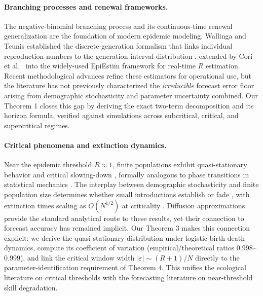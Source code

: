 \documentclass[review]{elsarticle}
\theoremstyle{plain}
\theoremstyle{definition}
\begin{document}
\paragraph{Branching processes and renewal frameworks.}
The negative-binomial branching process \citep{harris1963branching} and its continuous-time renewal generalization \citep{jagers1975branching} are the foundation of modern epidemic modeling. Wallinga and Teunis \citep{wallinga2004different} established the discrete-generation formalism that links individual reproduction numbers to the generation-interval distribution \citep{wallinga2007generation}, extended by Cori et al.~\citep{cori2013framework} into the widely-used EpiEstim framework for real-time $R$ estimation. Recent methodological advances \citep{gostic2020practical, abbott2020epinow2} refine these estimators for operational use, but the literature has not previously characterized the \emph{irreducible} forecast error floor arising from demographic stochasticity and parameter uncertainty combined. Our Theorem 1 closes this gap by deriving the exact two-term decomposition and its horizon formula, verified against simulations across subcritical, critical, and supercritical regimes.

\paragraph{Critical phenomena and extinction dynamics.}
Near the epidemic threshold $R \approx 1$, finite populations exhibit quasi-stationary behavior \citep{nassel2001extinction} and critical slowing-down \citep{kessler2007extinction, assaf2017extinction}, formally analogous to phase transitions in statistical mechanics \citep{grassberger1983critical}. The interplay between demographic stochasticity and finite population size determines whether small introductions establish or fade \citep{lloydsmith2005should}, with extinction times scaling as $O(N^{1/2})$ at criticality \citep{doering2005extinction, ovaskainen2010stochastic}. Diffusion approximations \citep{ethier1986markov} provide the standard analytical route to these results, yet their connection to forecast accuracy has remained implicit. Our Theorem 3 makes this connection explicit: we derive the quasi-stationary distribution under logistic birth-death dynamics, compute its coefficient of variation (empirical/theoretical ratios 0.998--0.999), and link the critical window width $|\varepsilon| \sim (R+1)/N$ directly to the parameter-identification requirement of Theorem 4. This unifies the ecological literature on critical thresholds with the forecasting literature on near-threshold skill degradation.
\end{document}
